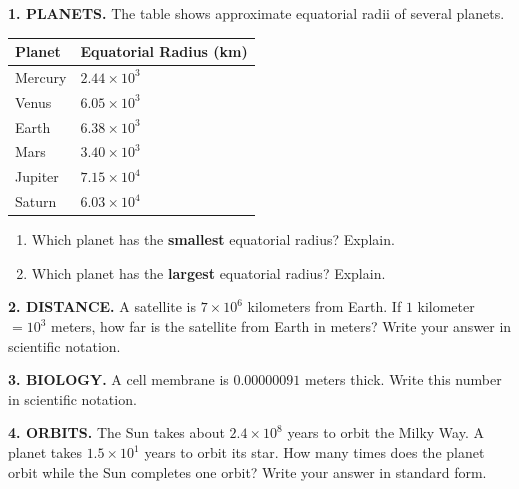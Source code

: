 \documentclass[11pt]{article}
\newcommand{\work}[1]{\vspace{#1}}
\begin{document}
\textbf{1. PLANETS.} The table shows approximate equatorial radii of several planets.

\vspace{0.4em}
\begin{tabular}{|>{\raggedright\arraybackslash}p{2.1in}|>{\raggedleft\arraybackslash}p{2.6in}|}
\hline
\textbf{Planet} & \textbf{Equatorial Radius (km)}\\
\hline
Mercury & $2.44\times10^{3}$\\
Venus   & $6.05\times10^{3}$\\
Earth   & $6.38\times10^{3}$\\
Mars    & $3.40\times10^{3}$\\
Jupiter & $7.15\times10^{4}$\\
Saturn  & $6.03\times10^{4}$\\
\hline
\end{tabular}

\begin{enumerate}[label=\alph*.]
\item Which planet has the \textbf{smallest} equatorial radius? Explain.
\work{1.3in}

\item Which planet has the \textbf{largest} equatorial radius? Explain.
\work{1.3in}
\end{enumerate}

\vspace{0.6em}

\textbf{2. DISTANCE.} A satellite is $7\times10^{6}$ kilometers from Earth.  
If $1$ kilometer $=10^{3}$ meters, how far is the satellite from Earth in meters?
Write your answer in scientific notation.
\work{1.8in}

\textbf{3. BIOLOGY.} A cell membrane is $0.00000091$ meters thick.
Write this number in scientific notation.
\work{1.4in}

\textbf{4. ORBITS.} The Sun takes about $2.4\times10^{8}$ years to orbit the Milky Way.
A planet takes $1.5\times10^{1}$ years to orbit its star.
How many times does the planet orbit while the Sun completes one orbit?
Write your answer in standard form.
\work{2.0in}
\end{document}
